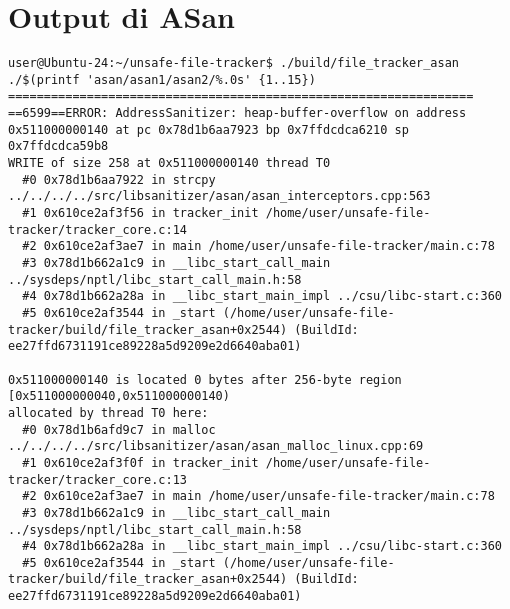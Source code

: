 \chapter{Output di ASan}
\label{appendix:asan_output}

\begin{lstlisting}[language={}, caption={Output di ASan sul primo caso di test}, numbers=none, inputencoding=utf8, basicstyle=\scriptsize\ttfamily]
user@Ubuntu-24:~/unsafe-file-tracker$ ./build/file_tracker_asan ./$(printf 'asan/asan1/asan2/%.0s' {1..15})
=================================================================
==6599==ERROR: AddressSanitizer: heap-buffer-overflow on address 0x511000000140 at pc 0x78d1b6aa7923 bp 0x7ffdcdca6210 sp 0x7ffdcdca59b8
WRITE of size 258 at 0x511000000140 thread T0
  #0 0x78d1b6aa7922 in strcpy ../../../../src/libsanitizer/asan/asan_interceptors.cpp:563
  #1 0x610ce2af3f56 in tracker_init /home/user/unsafe-file-tracker/tracker_core.c:14
  #2 0x610ce2af3ae7 in main /home/user/unsafe-file-tracker/main.c:78
  #3 0x78d1b662a1c9 in __libc_start_call_main ../sysdeps/nptl/libc_start_call_main.h:58
  #4 0x78d1b662a28a in __libc_start_main_impl ../csu/libc-start.c:360
  #5 0x610ce2af3544 in _start (/home/user/unsafe-file-tracker/build/file_tracker_asan+0x2544) (BuildId: ee27ffd6731191ce89228a5d9209e2d6640aba01)

0x511000000140 is located 0 bytes after 256-byte region [0x511000000040,0x511000000140)
allocated by thread T0 here:
  #0 0x78d1b6afd9c7 in malloc ../../../../src/libsanitizer/asan/asan_malloc_linux.cpp:69
  #1 0x610ce2af3f0f in tracker_init /home/user/unsafe-file-tracker/tracker_core.c:13
  #2 0x610ce2af3ae7 in main /home/user/unsafe-file-tracker/main.c:78
  #3 0x78d1b662a1c9 in __libc_start_call_main ../sysdeps/nptl/libc_start_call_main.h:58
  #4 0x78d1b662a28a in __libc_start_main_impl ../csu/libc-start.c:360
  #5 0x610ce2af3544 in _start (/home/user/unsafe-file-tracker/build/file_tracker_asan+0x2544) (BuildId: ee27ffd6731191ce89228a5d9209e2d6640aba01)


\end{lstlisting}
